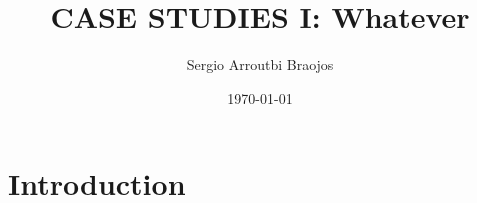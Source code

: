 \documentclass[11pt]{article}
\title{\textbf{CASE STUDIES I: Whatever}}
\author{Sergio Arroutbi Braojos}
\date{\today}
\begin{document}
\maketitle

\section{Introduction}

\section{}
\end{document}
